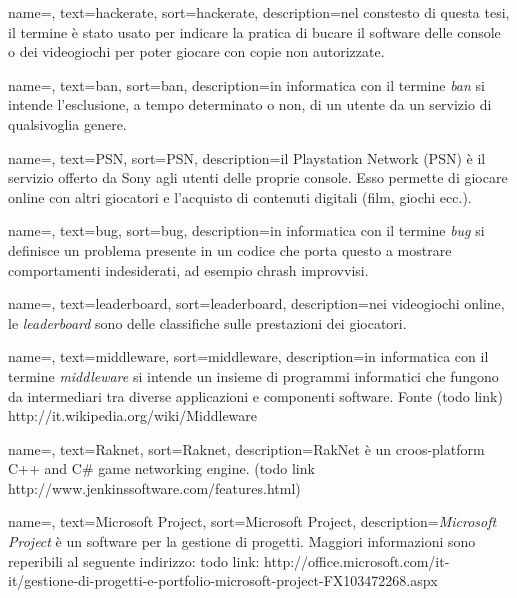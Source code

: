 {
	name=,
	text=hackerate,
	sort=hackerate,
	description={nel constesto di questa tesi, il termine è stato usato per indicare la pratica di bucare il software delle console o dei videogiochi per poter giocare con copie non autorizzate.}
}

{
	name=,
	text=ban,
	sort=ban,
	description={in informatica con il termine \emph{ban} si intende l'esclusione, a tempo determinato o non, di un utente da un servizio di qualsivoglia genere.}
}

{
	name=,
	text=PSN,
	sort=PSN,
	description={il Playstation Network (PSN) è il servizio offerto da Sony agli utenti delle proprie console. Esso permette di giocare online con altri giocatori e l'acquisto di contenuti digitali (film, giochi ecc.). }
}

{
	name=,
	text=bug,
	sort=bug,
	description={in informatica con il termine \emph{bug} si definisce un problema presente in un codice che porta questo a mostrare comportamenti indesiderati, ad esempio chrash improvvisi.}
}

{
	name=,
	text=leaderboard,
	sort=leaderboard,
	description={nei videogiochi online, le \emph{leaderboard} sono delle classifiche sulle prestazioni dei giocatori. }
}

{
	name=,
	text=middleware,
	sort=middleware,
	description={in informatica con il termine \emph{middleware} si intende un insieme di programmi informatici che fungono da intermediari tra diverse applicazioni e componenti software. Fonte (todo link) http://it.wikipedia.org/wiki/Middleware}
}

{
	name=,
	text=Raknet,
	sort=Raknet,
	description={RakNet è un croos-platform C++ and C# game networking engine. (todo link http://www.jenkinssoftware.com/features.html)}
}

{
	name=,
	text=Microsoft Project,
	sort=Microsoft Project,
	description={\emph{Microsoft Project} è un software per la gestione di progetti. Maggiori informazioni sono reperibili al seguente indirizzo: todo link: http://office.microsoft.com/it-it/gestione-di-progetti-e-portfolio-microsoft-project-FX103472268.aspx}
}


